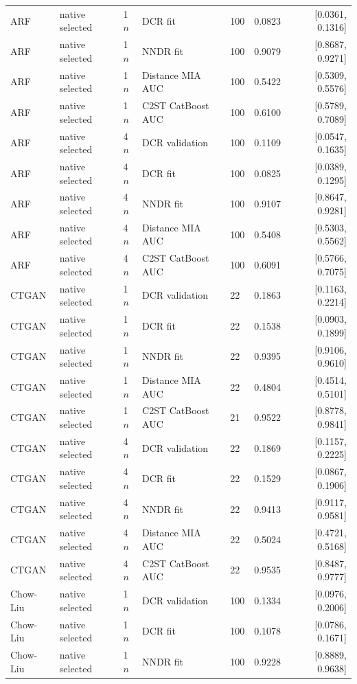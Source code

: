 \begin{longtable}{lllllrr}
ARF & native selected & 1$n$ & DCR fit & 100 & 0.0823 & [0.0361, 0.1316] \\
ARF & native selected & 1$n$ & NNDR fit & 100 & 0.9079 & [0.8687, 0.9271] \\
ARF & native selected & 1$n$ & Distance MIA AUC & 100 & 0.5422 & [0.5309, 0.5576] \\
ARF & native selected & 1$n$ & C2ST CatBoost AUC & 100 & 0.6100 & [0.5789, 0.7089] \\
ARF & native selected & 4$n$ & DCR validation & 100 & 0.1109 & [0.0547, 0.1635] \\
ARF & native selected & 4$n$ & DCR fit & 100 & 0.0825 & [0.0389, 0.1295] \\
ARF & native selected & 4$n$ & NNDR fit & 100 & 0.9107 & [0.8647, 0.9281] \\
ARF & native selected & 4$n$ & Distance MIA AUC & 100 & 0.5408 & [0.5303, 0.5562] \\
ARF & native selected & 4$n$ & C2ST CatBoost AUC & 100 & 0.6091 & [0.5766, 0.7075] \\
CTGAN & native selected & 1$n$ & DCR validation & 22 & 0.1863 & [0.1163, 0.2214] \\
CTGAN & native selected & 1$n$ & DCR fit & 22 & 0.1538 & [0.0903, 0.1899] \\
CTGAN & native selected & 1$n$ & NNDR fit & 22 & 0.9395 & [0.9106, 0.9610] \\
CTGAN & native selected & 1$n$ & Distance MIA AUC & 22 & 0.4804 & [0.4514, 0.5101] \\
CTGAN & native selected & 1$n$ & C2ST CatBoost AUC & 21 & 0.9522 & [0.8778, 0.9841] \\
CTGAN & native selected & 4$n$ & DCR validation & 22 & 0.1869 & [0.1157, 0.2225] \\
CTGAN & native selected & 4$n$ & DCR fit & 22 & 0.1529 & [0.0867, 0.1906] \\
CTGAN & native selected & 4$n$ & NNDR fit & 22 & 0.9413 & [0.9117, 0.9581] \\
CTGAN & native selected & 4$n$ & Distance MIA AUC & 22 & 0.5024 & [0.4721, 0.5168] \\
CTGAN & native selected & 4$n$ & C2ST CatBoost AUC & 22 & 0.9535 & [0.8487, 0.9777] \\
Chow-Liu & native selected & 1$n$ & DCR validation & 100 & 0.1334 & [0.0976, 0.2006] \\
Chow-Liu & native selected & 1$n$ & DCR fit & 100 & 0.1078 & [0.0786, 0.1671] \\
Chow-Liu & native selected & 1$n$ & NNDR fit & 100 & 0.9228 & [0.8889, 0.9638] \\

\end{longtable}
